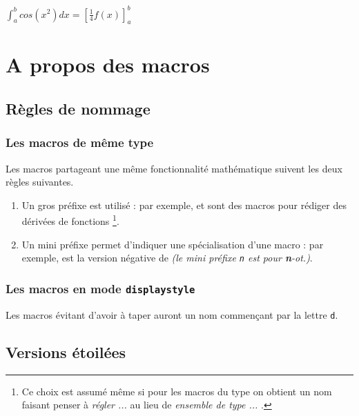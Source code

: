\documentclass[12pt,a4paper]{article}
\begin{document}
\begin{latexex}
$\displaystyle \int_a^b cos(x^2) dx
 = \left[ \frac{1}{4} f(x) \right]_a^b$
\end{latexex}




\section{A propos des macros}

\subsection{Règles de nommage}

\subsubsection{Les macros de même \og type \fg}

Les macros partageant une même fonctionnalité mathématique suivent les deux règles suivantes.
\begin{enumerate}
	\item Un gros préfixe est utilisé : 
	      par exemple,  et  sont des macros pour rédiger des dérivées de fonctions
	      \footnote{
	      	Ce choix est assumé même si pour les macros du type  on obtient un nom faisant penser à \emph{\og régler ... \fg} au lieu de \emph{\og ensemble de type ... \fg}.
		  }.

	\item Un mini préfixe permet d'indiquer une spécialisation d'une macro : 
	      par exemple,  est la version négative de  \emph{(le mini préfixe \texttt{n} est pour \textbf{n}-ot.)}.
\end{enumerate}




\subsubsection{Les macros en mode \texttt{displaystyle}}

Les macros évitant d'avoir à taper  auront un nom commençant par la lettre \verb+d+.




\subsection{Versions étoilées}
\end{document}
